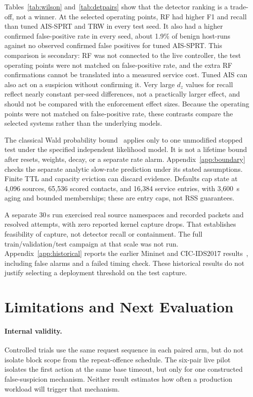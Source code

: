 \documentclass[conference]{IEEEtran}
\begin{document}
Tables~\ref{tab:wilson} and~\ref{tab:detpairs} show that the detector ranking is a
trade-off, not a winner. At the selected operating points, RF had higher F1 and
recall than tuned AIS-SPRT and TRW in every test seed. It also had a higher confirmed
false-positive rate in every seed, about 1.9\% of benign host-runs against
no observed confirmed false positives for tuned AIS-SPRT. This comparison is
secondary: RF was not connected to the live controller, the test operating points
were not matched on false-positive rate, and the extra RF confirmations cannot be
translated into a measured service cost. Tuned AIS can also act on a suspicion
without confirming it. Very large $d_z$ values for recall reflect nearly constant
per-seed differences, not a practically larger effect, and should not be compared
with the enforcement effect sizes. Because the operating points were not matched on
false-positive rate, these contrasts compare the selected systems rather than the
underlying models.

The classical Wald probability bound~\cite{wald1945sequential} applies only to one
unmodified stopped test under the specified independent likelihood model.
It is not a lifetime bound after resets, weights, decay, or a separate rate alarm.
Appendix~\ref{app:boundary} checks the separate analytic slow-rate prediction under its stated
assumptions. Finite TTL and capacity eviction can discard evidence. Defaults cap
state at 4,096 sources, 65,536 scored contacts, and 16,384 service entries, with
3,600~s aging and bounded memberships; these are entry caps, not RSS guarantees.

A separate 30\,s run exercised \ScaleSources{} real source namespaces and
recorded \ScalePackets{} packets and \ScaleAttempts{} resolved attempts, with
zero reported kernel capture drops. That establishes feasibility of capture,
not detector recall or containment. The full train/validation/test campaign at
that scale was not run. Appendix~\ref{app:historical} reports the earlier
Mininet and CIC-IDS2017 results~\cite{sharafaldin2018cicids}, including false
alarms and a failed timing check. These historical results do not justify
selecting a deployment threshold on the test capture.

\section{Limitations and Next Evaluation}
\paragraph{Internal validity.}
Controlled trials use the same request sequence in each paired arm, but do
not isolate block scope from the repeat-offence schedule. The six-pair live
pilot isolates the first action at the same base timeout, but only for one
constructed false-suspicion mechanism. Neither result estimates how often a
production workload will trigger that mechanism.
\end{document}
